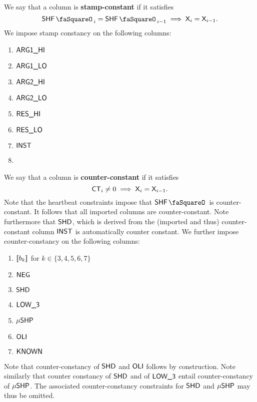 We say that a column  is \textbf{stamp-constant} if it satisfies
\[
	\shfStamp_{i} = \shfStamp_{i-1} \implies \col{X}_{i} = \col{X}_{i - 1}.
\]
We impose stamp constancy on the following columns:
\begin{multicols}{4}
\begin{enumerate}
	\item $\textsf{ARG}\textsf{1}\textsf{\_HI}$
	\item $\textsf{ARG}\textsf{1}\textsf{\_LO}$
	\item $\textsf{ARG}\textsf{2}\textsf{\_HI}$
	\item $\textsf{ARG}\textsf{2}\textsf{\_LO}$
	\item $\textsf{RES}\textsf{\_HI}$
	\item $\textsf{RES}\textsf{\_LO}$
	\item $\textsf{INST}$
	\item[\vspace{\fill}]
\end{enumerate}
\end{multicols}
\noindent We say that a column  is \textbf{counter-constant} if it satisfies
\[
	\textsf{CT}_{i} \neq 0 \implies \textsf{X}_{i} = \textsf{X}_{i - 1}.
\]
Note that the heartbeat constraints impose that $\shfStamp$ is counter-constant. It follows that all imported columns are counter-constant. Note furthermore that $\textsf{SHD}$, which is derived from the (imported and thus) counter-constant column $\textsf{INST}$ is automatically counter constant. We further impose counter-constancy on the following columns:
\begin{multicols}{3}
\begin{enumerate}
	\item $[\![b_{k}]\!]$ for $k \in \{3, 4, 5, 6, 7\}$
	\item $\textsf{NEG}$
	\item $\textsf{SHD}$
	\item $\textsf{LOW\_3}$
	\item $\textsf{$\mu$SHP}$
	\item $\textsf{OLI}$
	\item $\textsf{KNOWN}$
\end{enumerate}
\end{multicols}
Note that counter-constancy of $\textsf{SHD}$ and $\textsf{OLI}$ follows by construction. Note similarly that counter constancy of $\textsf{SHD}$ and of $\textsf{LOW\_3}$ entail counter-constancy of $\textsf{$\mu$SHP}$. The associated counter-constancy constraints for $\textsf{SHD}$ and $\textsf{$\mu$SHP}$ may thus be omitted.
